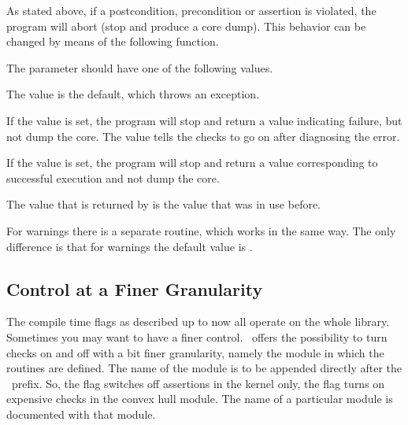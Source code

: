 As stated above, if a postcondition, precondition or assertion is
violated, the program will abort (stop and produce a core dump).
This behavior can be changed by means of the following function.


\ccGlueBegin
{}
\ccGlueEnd

The parameter should have one of the following values.

The  value is the default, which throws an exception.

If the  value is set, the program will stop and return a value 
indicating failure, but not dump the core. 
The  value tells the checks to go on after diagnosing the error.

\begin{ccAdvanced}
If the  value is set, the program will stop and 
return a value corresponding to successful execution and not dump the core. 
\end{ccAdvanced}

The value that is returned by  is the value that was in use before.

For warnings there is a separate routine, which works in the same way.
The only difference is that for warnings the default value is
.

\ccGlueBegin
{}
\ccGlueEnd

\subsection{Control at a Finer Granularity}

The compile time flags as described up to now all operate on the whole 
library.
Sometimes you may want to have a finer control.
\cgal\ offers the possibility to turn checks on and off with a bit finer
granularity, namely the module in which the routines are defined.
The name of the module is to be appended directly after the \cgal\ prefix.
So, the flag  switches off assertions in 
the kernel only, the flag  turns on
expensive checks in the convex hull module.
The name of a particular module is documented with that module.

